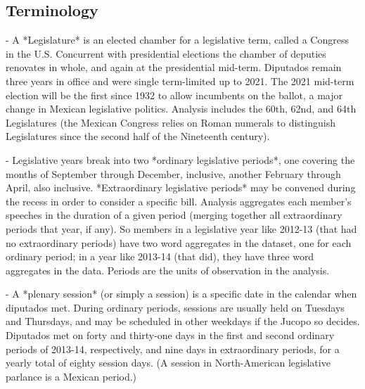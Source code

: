 \documentclass[letter,12pt]{article}
\begin{document}


\subsection{Terminology}


- A *Legislature* is an elected chamber for a legislative term, called a Congress in the U.S. Concurrent with presidential elections the chamber of deputies renovates in whole, and again at the presidential mid-term. Diputados remain three years in office and were single term-limited up to 2021. The 2021 mid-term election will be the first since 1932 to allow incumbents on the ballot, a major change in Mexican legislative politics. Analysis includes the 60th, 62nd, and 64th Legislatures (the Mexican Congress relies on Roman numerals to distinguish Legislatures since the second half of the Nineteenth century).

- Legislative years break into two *ordinary legislative periods*, one covering the months of September through December, inclusive, another February through April, also inclusive. *Extraordinary legislative periods* may be convened during the recess in order to consider a specific bill. Analysis aggregates each member's speeches in the duration of a given period (merging together all extraordinary periods that year, if any). So members in a legislative year like 2012-13 (that had no extraordinary periods) have two word aggregates in the dataset, one for each ordinary period; in a year like 2013-14 (that did), they have three word aggregates in the data. Periods are the units of observation in the analysis. 

- A *plenary session* (or simply a session) is a specific date in the calendar when diputados met. During ordinary periods, sessions are usually held on Tuesdays and Thursdays, and may be scheduled in other weekdays if the Jucopo so decides. Diputados met on forty and thirty-one days in the first and second ordinary periods of 2013-14, respectively, and nine days in extraordinary periods, for a yearly total of eighty session days. (A session in North-American legislative parlance is a Mexican period.)
\end{document}
